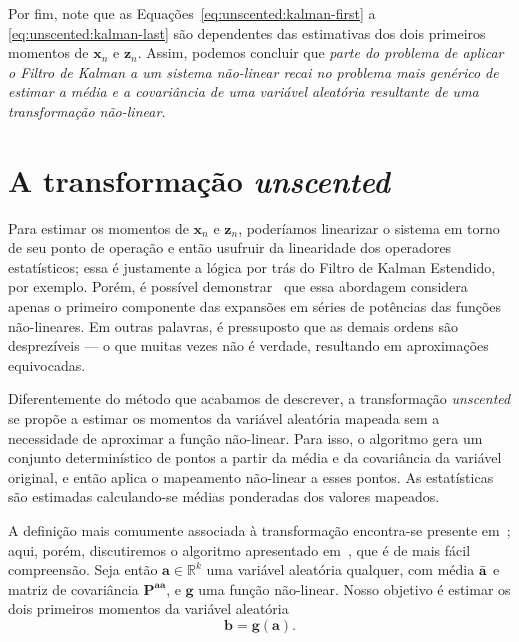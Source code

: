Por fim, note que as Equações~\eqref{eq:unscented:kalman-first} a
\eqref{eq:unscented:kalman-last} são dependentes das estimativas dos dois primeiros
momentos de $\mathbf{x}_n$ e $\mathbf{z}_n$. Assim, podemos concluir que \emph{parte do
	problema de aplicar o Filtro de Kalman a um sistema não-linear recai no problema mais
	genérico de estimar a média e a covariância de uma variável aleatória resultante de uma
	transformação não-linear.}

\section{A transformação \textit{unscented}}

Para estimar os momentos de $\mathbf{x}_{n}$ e $\mathbf{z}_n$, poderíamos linearizar o
sistema em torno de seu ponto de operação e então usufruir da linearidade dos
operadores estatísticos; essa é justamente a lógica por trás do Filtro de Kalman
Estendido, por exemplo. Porém, é possível demonstrar~\cite{julier-1997} que essa
abordagem considera apenas o primeiro componente das expansões em séries de potências
das funções não-lineares. Em outras palavras, é pressuposto que as demais ordens são
desprezíveis --- o que muitas vezes não é verdade, resultando em aproximações
equivocadas.

Diferentemente do método que acabamos de descrever, a transformação \textit{unscented}
se propõe a estimar os momentos da variável aleatória mapeada sem a necessidade de
aproximar a função não-linear. Para isso, o algoritmo gera um conjunto determinístico
de pontos a partir da média e da covariância da variável original, e então aplica o
mapeamento não-linear a esses pontos. As estatísticas são estimadas calculando-se
médias ponderadas dos valores mapeados.

A definição mais comumente associada à transformação encontra-se presente
em~\cite{julier-2002}; aqui, porém, discutiremos o algoritmo apresentado
em~\cite{julier-1997}, que é de mais fácil compreensão. Seja então $\mathbf{a} \in
	\mathbb{R}^k$ uma variável aleatória qualquer, com média $\Bar{\mathbf{a}}$ e matriz de
covariância $\mathbf{P}^{\mathbf{a}\mathbf{a}}$, e $\mathbf{g}$ uma função não-linear.
Nosso objetivo é estimar os dois primeiros momentos da variável aleatória
\begin{equation}
	\mathbf{b} = \mathbf{g}(\mathbf{a}).
\end{equation}

